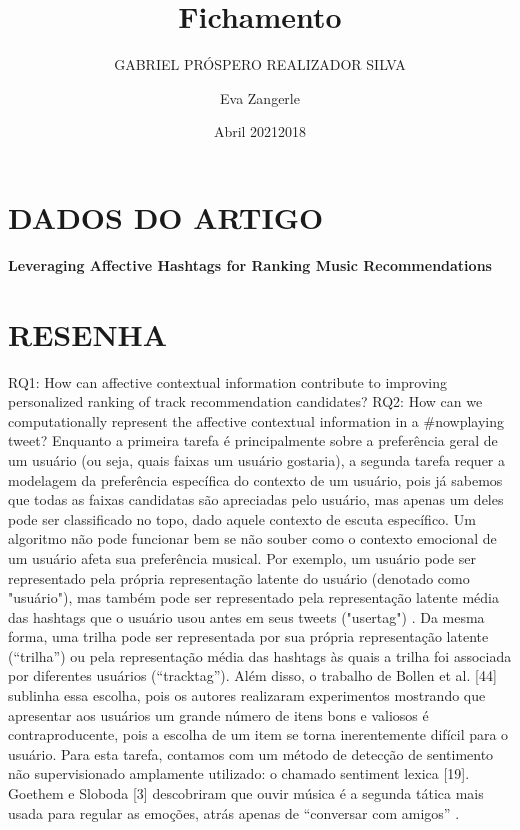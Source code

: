 \documentclass{article}
\title{Fichamento}
\author{GABRIEL PRÓSPERO REALIZADOR  SILVA}
\date{Abril 2021}
\begin{document}
\maketitle

\section{DADOS DO ARTIGO}
\textbf{Leveraging Affective Hashtags for Ranking Music Recommendations \\}
\author{Eva Zangerle \\}
\date{2018}

\section{RESENHA}
RQ1: How can affective contextual information contribute to improving personalized ranking of track recommendation candidates?
RQ2: How can we computationally represent the affective contextual information in a #nowplaying tweet? 
Enquanto a primeira tarefa é principalmente sobre a preferência geral de um usuário (ou seja, quais faixas um usuário gostaria), a segunda tarefa requer a modelagem da preferência específica do contexto de um usuário, pois já sabemos que todas as faixas candidatas são apreciadas pelo usuário, mas apenas um deles pode ser classificado no topo, dado aquele contexto de escuta específico. Um algoritmo não pode funcionar bem se não souber como o contexto emocional de um usuário afeta sua preferência musical.
Por exemplo, um usuário pode ser representado pela própria representação latente do usuário (denotado como "usuário"), mas também pode ser representado pela representação latente média das hashtags que o usuário usou antes em seus tweets ("usertag") . Da mesma forma, uma trilha pode ser representada por sua própria representação latente (“trilha”) ou pela representação média das hashtags às quais a trilha foi associada por diferentes usuários (“tracktag”).
Além disso, o trabalho de Bollen et al. [44] sublinha essa escolha, pois os autores realizaram experimentos mostrando que apresentar aos usuários um grande número de itens bons e valiosos é contraproducente, pois a escolha de um item se torna inerentemente difícil para o usuário.
Para esta tarefa, contamos com um método de detecção de sentimento não supervisionado amplamente utilizado: o chamado sentiment lexica [19].
Goethem e Sloboda [3] descobriram que ouvir música é a segunda tática mais usada para regular as emoções, atrás apenas de “conversar com amigos” .
\end{document}
